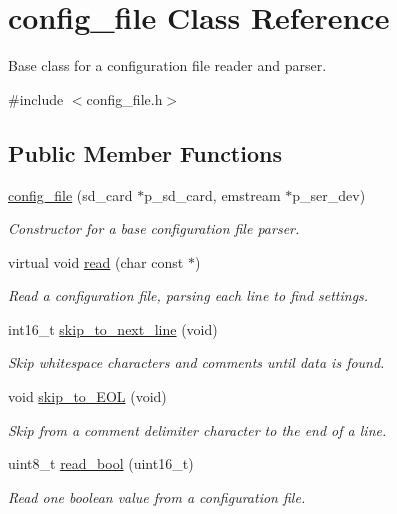 \hypertarget{classconfig__file}{\section{config\-\_\-file Class Reference}
\label{classconfig__file}
}


Base class for a configuration file reader and parser.  




{\ttfamily \#include $<$config\-\_\-file.\-h$>$}

\subsection*{Public Member Functions}
\begin{DoxyCompactItemize}
\item 
\hyperlink{classconfig__file_ac2724c3ca140fd2932cb956d0f06e315}{config\-\_\-file} (sd\-\_\-card $\ast$p\-\_\-sd\-\_\-card, emstream $\ast$p\-\_\-ser\-\_\-dev)
\begin{DoxyCompactList}\small\item\em Constructor for a base configuration file parser. \end{DoxyCompactList}\item 
virtual void \hyperlink{classconfig__file_a55798c93bc529cfa7d79e199f1ad7925}{read} (char const $\ast$)
\begin{DoxyCompactList}\small\item\em Read a configuration file, parsing each line to find settings. \end{DoxyCompactList}\item 
int16\-\_\-t \hyperlink{classconfig__file_aa0c5fee1c2a104dd501f4499b526b184}{skip\-\_\-to\-\_\-next\-\_\-line} (void)
\begin{DoxyCompactList}\small\item\em Skip whitespace characters and comments until data is found. \end{DoxyCompactList}\item 
void \hyperlink{classconfig__file_a05bfc7892289bec6441710bf7f2c092b}{skip\-\_\-to\-\_\-\-E\-O\-L} (void)
\begin{DoxyCompactList}\small\item\em Skip from a comment delimiter character to the end of a line. \end{DoxyCompactList}\item 
uint8\-\_\-t \hyperlink{classconfig__file_a672af5504446db5f89896aada5980468}{read\-\_\-bool} (uint16\-\_\-t)
\begin{DoxyCompactList}\small\item\em Read one boolean value from a configuration file. \end{DoxyCompactList}\end{DoxyCompactItemize}

